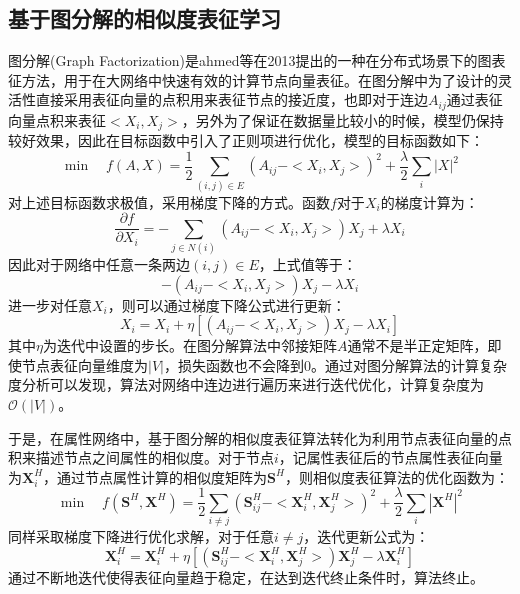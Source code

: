 \subsection{基于图分解的相似度表征学习}
图分解(Graph Factorization)\cite{ahmed2013distributed}是ahmed等在2013提出的一种在分布式场景下的图表征方法，用于在大网络中快速有效的计算节点向量表征。在图分解中为了设计的灵活性直接采用表征向量的点积用来表征节点的接近度，也即对于连边$A_{ij}$通过表征向量点积来表征$<X_i, X_j>$，另外为了保证在数据量比较小的时候，模型仍保持较好效果，因此在目标函数中引入了正则项进行优化，模型的目标函数如下：
\begin{equation}
	\min \quad f(A, X)=\frac{1}{2} \sum_{(i,j)\in E}(A_{ij}-<X_i, X_j>)^2+\frac{\lambda}{2}\sum_i|X|^2
\end{equation}
对上述目标函数求极值，采用梯度下降的方式。函数$f$对于$X_i$的梯度计算为：
\begin{equation}
\frac{\partial f}{\partial X_i} = -\sum_{j\in N(i)} (A_{ij}-<X_i,X_j>)X_j+\lambda X_i
\end{equation}
因此对于网络中任意一条两边$(i,j)\in E$，上式值等于：
\begin{equation}
	-(A_{ij}-<X_i, X_j>)X_j - \lambda X_i
\end{equation}
进一步对任意$X_i$，则可以通过梯度下降公式进行更新：
\begin{equation}
	X_i = X_i + \eta [(A_{ij}-<X_i, X_j>)X_j - \lambda X_i]
\end{equation}
其中$\eta$为迭代中设置的步长。在图分解算法中邻接矩阵$A$通常不是半正定矩阵，即使节点表征向量维度为$|V|$，损失函数也不会降到0。通过对图分解算法的计算复杂度分析可以发现，算法对网络中连边进行遍历来进行迭代优化，计算复杂度为$\mathcal{O}(|V|)$。

于是，在属性网络中，基于图分解的相似度表征算法转化为利用节点表征向量的点积来描述节点之间属性的相似度。对于节点$i$，记属性表征后的节点属性表征向量为$\textbf{X}_i^H$，通过节点属性计算的相似度矩阵为$\textbf{S}^H$，则相似度表征算法的优化函数为：
\begin{equation}
\min \quad f(\textbf{S}^H, \textbf{X}^H)=\frac{1}{2} \sum_{i\ne j}(\textbf{S}^H_{ij}-<\textbf{X}^H_i, \textbf{X}^H_j>)^2+\frac{\lambda}{2}\sum_i|\textbf{X}^H|^2
\end{equation}
同样采取梯度下降进行优化求解，对于任意$i\ne j$，迭代更新公式为：
\begin{equation}
	\textbf{X}^H_i = \textbf{X}^H_i + \eta [(\textbf{S}^H_{ij}-<\textbf{X}^H_i, \textbf{X}^H_j>)\textbf{X}^H_j - \lambda \textbf{X}^H_i]
\end{equation}
通过不断地迭代使得表征向量趋于稳定，在达到迭代终止条件时，算法终止。

